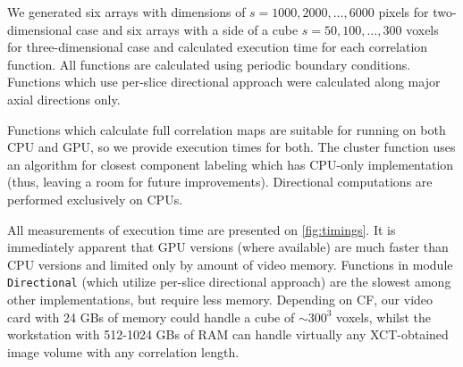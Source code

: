 \documentclass[1p]{elsarticle}
\newcommand{\code}[1]{\colorbox{light-gray}{\texttt{#1}}}
\begin{document}
We generated six arrays with dimensions of $s = 1000, 2000, \dots, 6000$ pixels
for two-dimensional case and six arrays with a side of a cube $s = 50, 100,
\dots, 300$ voxels for three-dimensional case and calculated execution time for
each correlation function. All functions are calculated using periodic boundary
conditions. Functions which use per-slice directional approach were calculated
along major axial directions only.

Functions which calculate full correlation maps are suitable for running on both
CPU and GPU, so we provide execution times for both. The cluster function uses
an algorithm for closest component labeling which has CPU-only implementation
(thus, leaving a room for future improvements). Directional computations are
performed exclusively on CPUs.

All measurements of execution time are presented on \cref{fig:timings}. It is
immediately apparent that GPU versions (where available) are much faster than
CPU versions and limited only by amount of video memory. Functions in module
\code{Directional} (which utilize per-slice directional approach) are the
slowest among other implementations, but require less memory. Depending on CF,
our video card with 24 GBs of memory could handle a cube of $\sim 300^3$
voxels, whilst the workstation with 512-1024 GBs of RAM can handle virtually any
XCT-obtained image volume with any correlation length.
\end{document}
